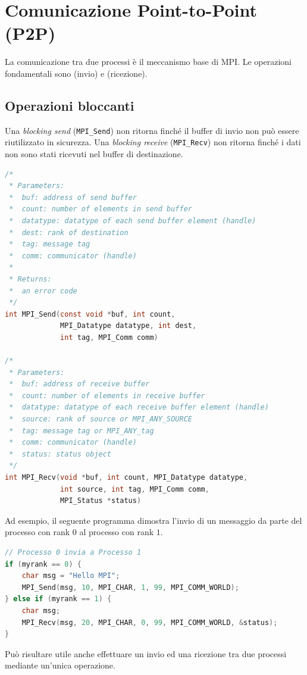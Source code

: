 \section{Comunicazione Point-to-Point (P2P)} 
La comunicazione tra due processi è il meccanismo base di MPI. Le operazioni fondamentali sono  (invio) e  (ricezione). 

\subsection{Operazioni bloccanti}
Una \textit{blocking send} (\texttt{MPI\_Send}) non ritorna finché il buffer di invio non può essere riutilizzato in sicurezza. Una \textit{blocking receive} (\texttt{MPI\_Recv}) non ritorna finché i dati non sono stati ricevuti nel buffer di destinazione.

\begin{lstlisting}[language=C, numbers=none]
/*
 * Parameters:
 *  buf: address of send buffer
 *  count: number of elements in send buffer
 *  datatype: datatype of each send buffer element (handle)
 *  dest: rank of destination
 *  tag: message tag
 *  comm: communicator (handle)
 * 
 * Returns:
 *  an error code
 */
int MPI_Send(const void *buf, int count,
             MPI_Datatype datatype, int dest,
             int tag, MPI_Comm comm)

/*
 * Parameters:
 *  buf: address of receive buffer
 *  count: number of elements in receive buffer
 *  datatype: datatype of each receive buffer element (handle)
 *  source: rank of source or MPI_ANY_SOURCE
 *  tag: message tag or MPI_ANY_tag
 *  comm: communicator (handle)
 *  status: status object
 */
int MPI_Recv(void *buf, int count, MPI_Datatype datatype,
             int source, int tag, MPI_Comm comm,
             MPI_Status *status)
\end{lstlisting}

Ad esempio, il seguente programma dimostra l'invio di un messaggio da parte del processo con rank \(0\) al processo con rank \(1\).
\begin{lstlisting}[language=C, numbers=none]
// Processo 0 invia a Processo 1
if (myrank == 0) {
    char msg = "Hello MPI";
    MPI_Send(msg, 10, MPI_CHAR, 1, 99, MPI_COMM_WORLD);
} else if (myrank == 1) {
    char msg;
    MPI_Recv(msg, 20, MPI_CHAR, 0, 99, MPI_COMM_WORLD, &status);
}
\end{lstlisting}

Può risultare utile anche effettuare un invio ed una ricezione tra due processi mediante un'unica operazione.

